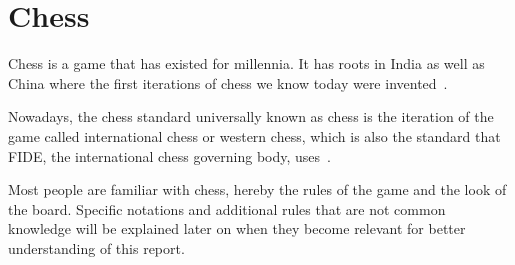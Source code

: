 \section{Chess}\label{sec:chess}

Chess is a game that has existed for millennia.
It has roots in India as well as China where the first iterations of chess we know today were
invented~\cite{murray1913}.

Nowadays, the chess standard universally known as chess is the iteration of the game called international chess or
western chess, which is also the standard that FIDE, the international chess governing body, uses~\cite{fide2024}.

Most people are familiar with chess, hereby the rules of the game and the look of the board.
Specific notations and additional rules that are not common knowledge will be explained later on
when they become relevant for better understanding of this report.
